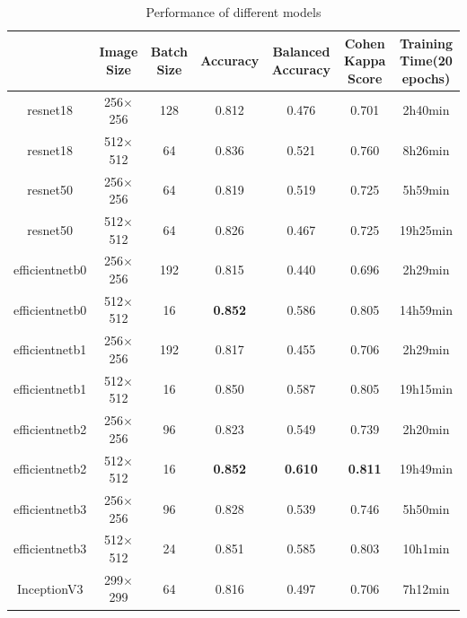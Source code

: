 \documentclass[../main.tex]{subfiles}
\begin{document}
\begin{table}[htbp]
\linespread{1.5} 
\renewcommand\arraystretch{1.25}
\centering
\begin{tabular}{|c|c|c|c|c|c|c|}
    \hline
     \textbf   & Image Size  & Batch Size & Accuracy & Balanced Accuracy & Cohen Kappa Score & Training Time(20 epochs)\\
     \hline
     resnet18   &   256$\times$256 & 128 & 0.812 & 0.476 & 0.701 & 2h40min         \\
     \hline
     resnet18  &   512$\times$512  & 64 & 0.836 & 0.521 & 0.760 & 8h26min       \\
     \hline
     resnet50  &  256$\times$256 & 64 & 0.819 & 0.519 & 0.725   & 5h59min       \\
     \hline
     resnet50  &  512$\times$512 & 64 & 0.826 & 0.467 & 0.725    & 19h25min      \\
     \hline
     efficientnetb0 & 256$\times$256 & 192 & 0.815 & 0.440 & 0.696 & 2h29min  \\
     \hline
     efficientnetb0 & 512$\times$512 & 16 & \textbf{0.852} & 0.586 & 0.805 & 14h59min\\
     \hline
     efficientnetb1 & 256$\times$256 & 192 & 0.817 & 0.455 & 0.706 & 2h29min  \\ 
     \hline
     efficientnetb1 & 512$\times$512 & 16 & 0.850 & 0.587 & 0.805 & 19h15min  \\
     \hline
     efficientnetb2 & 256$\times$256 & 96 & 0.823 & 0.549 & 0.739 & 2h20min \\
     \hline
     efficientnetb2 & 512$\times$512 & 16 & \textbf{0.852} & \textbf{0.610} & \textbf{0.811} & 19h49min \\
     \hline
     efficientnetb3 & 256$\times$256 & 96 & 0.828 & 0.539 & 0.746 & 5h50min \\
     \hline
     efficientnetb3 & 512$\times$512 & 24 & 0.851 & 0.585 & 0.803 & 10h1min \\
     \hline
     InceptionV3 & 299$\times$299 & 64 & 0.816 & 0.497 & 0.706 & 7h12min \\
     \hline
\end{tabular}
\caption{Performance of different models}
\label{tab:test performance}   
\end{table}

\end{document}
